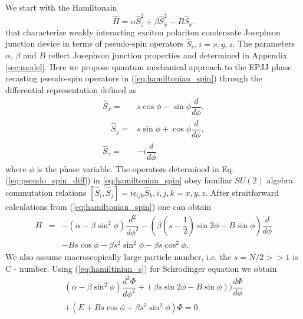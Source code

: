 \documentclass[aps, pre, preprint, groupedaddress, superscriptaddress, showkeys, showpacs] {revtex4-1}
\begin{document}
We start with the Hamiltonain 
%
\begin{equation}
\hat{H} = \alpha \hat{S}_z^2 + \beta \hat{S}_x^2 - B \hat{S}_x.
\label{eq:hamiltonian_spin}
\end{equation}
that characterize weakly interacting exciton polariton condensate Josephson junction device in terms of pseudo-spin operators $\hat{S}_i$, $i=x,y,z$.
The parameters $\alpha$, $\beta$ and $B$ reflect  Josephson junction properties and determined in Appendix \ref{sec:model}. 
Here we propose quantum mechanical approach to the EPJJ  phase recasting pseudo-spin operators in  (\ref{eq:hamiltonian_spin}) through the differential representation defined as
% 
\begin{subequations}
\begin{align}
\hat{S}_x = & s \cos{\phi} - \sin{\phi} \dfrac{d}{d \phi}, \\
\quad \hat{S}_y = & s \sin{\phi} + \cos{\phi} \dfrac{d}{d \phi}, \\
\hat{S}_z = & -i\dfrac{d}{d \phi}
\end{align}
\label{eq:pseudo_spin_diff}
\end{subequations}
%
where  $\phi$ is the phase variable.
The operators determined in Eq. (\ref{eq:pseudo_spin_diff}) in \eqref{eq:hamiltonian_spin}
 obey familiar $SU(2)$ algebra commutation relations $[\hat{S}_i, \hat{S}_j] = i\epsilon_{ijk}\hat{S}_k,  i,j,k=x,y,z$.
After straitforward calculations from (\ref{eq:hamiltonian_spin}) one can obtain
%
\begin{equation}
\begin{array}{lcl}
H & = & -(\alpha - \beta \sin^2 \phi) \dfrac{d^2}{d \phi^2} - (\beta(s-\dfrac{1}{2})\sin{2\phi} - B\sin{\phi}) \dfrac{d}{d \phi} \\
&& - Bs \cos \phi - \beta s^2 \sin^2 \phi - \beta s \cos^2 \phi.
\end{array}
\label{eq:hamiltinian_s}
\end{equation}
%
We also assume macroscopically large particle number, i.e. the $s = N/2 >> 1$ is C - number. Using (\ref{eq:hamiltinian_s})  for Schrodinger equation we obtain   
%
\begin{equation}
\begin{array}{l}
(\alpha - \beta \sin^2 \phi) \dfrac{d^2 \Phi}{d \phi^2} + (\beta s\sin{2\phi}-B\sin{\phi})) \dfrac{d \Phi}{d \phi} \\
+ (E + B s \cos \phi + \beta s^2 \sin^2 \phi) \Phi = 0,
\end{array}
\label{eq:schrodinger}
\end{equation}
\end{document}
